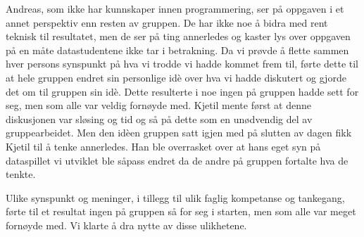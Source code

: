 Andreas, som ikke har kunnskaper innen programmering, ser på oppgaven i
et annet perspektiv enn resten av gruppen. De har ikke noe å bidra med
rent teknisk til resultatet, men de ser på ting annerledes og kaster lys
over oppgaven på en måte datastudentene ikke tar i betrakning. Da vi
prøvde å flette sammen hver persons synspunkt på hva vi trodde vi hadde
kommet frem til, førte dette til at hele gruppen endret sin personlige
idè over hva vi hadde diskutert og gjorde det om til gruppen sin idè.
Dette resulterte i noe ingen på gruppen hadde sett for seg, men som alle
var veldig fornøyde med.  Kjetil mente først at denne diskusjonen var
sløsing og tid og så på dette som en unødvendig del av gruppearbeidet.
Men den idèen gruppen satt igjen med på slutten av dagen fikk Kjetil til
å tenke annerledes. Han ble overrasket over at hans eget syn på
dataspillet vi utviklet ble såpass endret da de andre på gruppen
fortalte hva de tenkte. 

Ulike synspunkt og meninger, i tillegg til ulik faglig kompetanse og
tankegang, førte til et resultat ingen på gruppen så for seg i starten,
men som alle var meget fornøyde med. Vi klarte å dra nytte av disse
ulikhetene.
